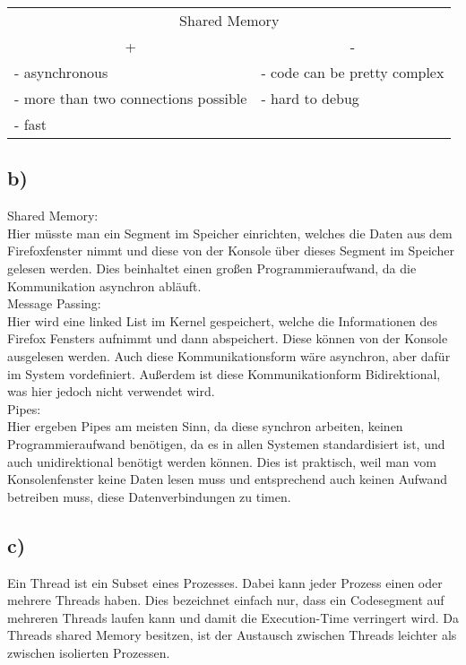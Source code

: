 \documentclass[a4paper, 11pt]{article}
\begin{document}
    \begin{table}[h]
        \begin{tabular}{@{}llll@{}}
        \multicolumn{4}{c}{Shared Memory}                                                                                      \\
        \multicolumn{2}{c}{+}                         & \multicolumn{2}{c}{-}                                          \\ \midrule
        \multicolumn{2}{l|}{- asynchronous} & \multicolumn{2}{l}{- code can be pretty complex}            \\
        \multicolumn{2}{l|}{- more than two connections possible} & \multicolumn{2}{l}{- hard to debug} \\
        \multicolumn{2}{l|}{- fast}      & \multicolumn{2}{l}{}                                          
        \end{tabular}
        \end{table}
        \subsection*{b)}
        Shared Memory: \\
        Hier müsste man ein Segment im Speicher einrichten, welches die Daten aus dem Firefoxfenster nimmt und diese von der Konsole über dieses Segment im Speicher gelesen werden.
        Dies beinhaltet einen großen Programmieraufwand, da die Kommunikation asynchron abläuft.\\
        Message Passing:\\
        Hier wird eine linked List im Kernel gespeichert, welche die Informationen des Firefox Fensters aufnimmt und dann abspeichert. Diese können von der Konsole ausgelesen werden.
        Auch diese Kommunikationsform wäre asynchron, aber dafür im System vordefiniert. Außerdem ist diese Kommunikationform Bidirektional, was hier jedoch nicht verwendet wird.
        \\
        Pipes:\\
        Hier ergeben Pipes am meisten Sinn, da diese synchron arbeiten, keinen Programmieraufwand benötigen, da es in allen Systemen standardisiert ist, und
        auch unidirektional benötigt werden können. Dies ist praktisch, weil man vom Konsolenfenster keine Daten lesen muss und entsprechend auch keinen Aufwand betreiben muss, diese Datenverbindungen zu timen.
        \newpage
        \subsection*{c)}
        Ein Thread ist ein Subset eines Prozesses. Dabei kann jeder Prozess einen oder mehrere Threads haben. Dies bezeichnet einfach nur, dass ein Codesegment auf mehreren Threads laufen kann und damit die Execution-Time verringert wird.
        Da Threads shared Memory besitzen, ist der Austausch zwischen Threads leichter als zwischen isolierten Prozessen.
\end{document}

